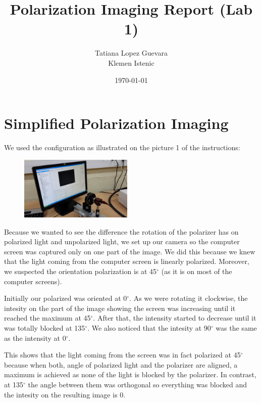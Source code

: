 \documentclass{article}
\begin{document}
\title{Polarization Imaging Report (Lab 1)}
\date {\today}
\author{Tatiana Lopez Guevara\\Klemen Istenic}
\maketitle

\section{Simplified Polarization Imaging}

We used the configuration as illustrated on the picture 1 of the 
instructions:

\begin{figure}
\caption{}
\centering
\includegraphics[width=0.48\textwidth,natwidth=100,natheight=100]{../photos/s1.jpg}
\label{fig:}
\end{figure}

Because we wanted to see the difference the rotation of the polarizer has 
on polarized light and unpolarized light, we set up our camera so the computer
screen was captured only on one part of the image. 
We did this because we knew that the light coming from the computer
screen is linearly polarized. Moreover, we suspected the orientation polarization
is at 45$^\circ$ (as it is on most of the computer screens).

Initially our polarized was oriented at 0$^\circ$. As we were rotating it clockwise,
 the intesity on the part of the image showing the screen was increasing until 
it reached the maximum at 45$^\circ$. After that, the intensity started to decrease
until it was totally blocked at 135$^\circ$. We also noticed that the intesity
at 90$^\circ$ was the same as the intensity at 0$^\circ$.

This shows that the light coming from the screen was in fact polarized
at 45$^\circ$ because when both, angle of polarized light and the polarizer
are aligned, a maximum is achieved as none of the light is blocked by the polarizer.
In contrast, at 135$^\circ$ the angle between them was orthogonal so everything
was blocked and the intesity on the resulting image is 0.
\end{document}
